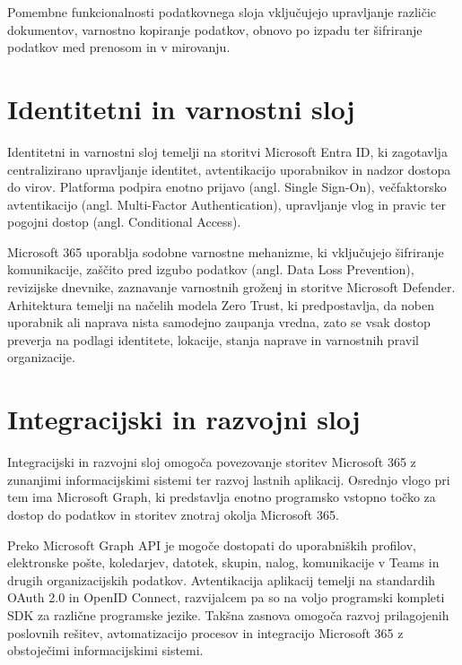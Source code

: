 \documentclass[a4paper, 12pt]{book}
\begin{document}
Pomembne funkcionalnosti podatkovnega sloja vključujejo upravljanje različic dokumentov, varnostno kopiranje podatkov, obnovo po izpadu ter šifriranje podatkov med prenosom in v mirovanju.~\cite{assurance}

\section{Identitetni in varnostni sloj}

Identitetni in varnostni sloj temelji na storitvi Microsoft Entra ID, ki zagotavlja centralizirano upravljanje identitet, avtentikacijo uporabnikov in nadzor dostopa do virov. Platforma podpira enotno prijavo (angl. Single Sign-On), večfaktorsko avtentikacijo (angl. Multi-Factor Authentication), upravljanje vlog in pravic ter pogojni dostop (angl. Conditional Access).~\cite{entraid}

Microsoft 365 uporablja sodobne varnostne mehanizme, ki vključujejo šifriranje komunikacije, zaščito pred izgubo podatkov (angl. Data Loss Prevention), revizijske dnevnike, zaznavanje varnostnih groženj in storitve Microsoft Defender.
Arhitektura temelji na načelih modela Zero Trust, ki predpostavlja, da noben uporabnik ali naprava nista samodejno zaupanja vredna, zato se vsak dostop preverja na podlagi identitete, lokacije, stanja naprave in varnostnih pravil organizacije.~\cite{zerotrust}


\section{Integracijski in razvojni sloj}

Integracijski in razvojni sloj omogoča povezovanje storitev Microsoft 365 z zunanjimi informacijskimi sistemi ter razvoj lastnih aplikacij.
Osrednjo vlogo pri tem ima Microsoft Graph, ki predstavlja enotno programsko vstopno točko za dostop do podatkov in storitev znotraj okolja Microsoft 365.~\cite{graphoverview}

Preko Microsoft Graph API je mogoče dostopati do uporabniških profilov, elektronske pošte, koledarjev, datotek, skupin, nalog, komunikacije v Teams in drugih organizacijskih podatkov.
Avtentikacija aplikacij temelji na standardih OAuth 2.0 in OpenID Connect, razvijalcem pa so na voljo programski kompleti SDK za različne programske jezike.
Takšna zasnova omogoča razvoj prilagojenih poslovnih rešitev, avtomatizacijo procesov in integracijo Microsoft 365 z obstoječimi informacijskimi sistemi.~\cite{graphapi}
\end{document}
